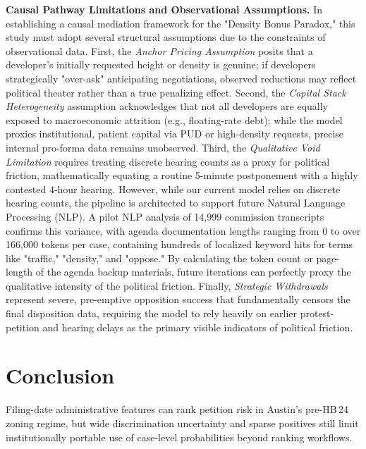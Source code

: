 \documentclass[11pt, letterpaper, oneside]{article}
\begin{document}
\textbf{Causal Pathway Limitations and Observational Assumptions.} In establishing a causal mediation framework for the "Density Bonus Paradox," this study must adopt several structural assumptions due to the constraints of observational data. First, the \textit{Anchor Pricing Assumption} posits that a developer's initially requested height or density is genuine; if developers strategically "over-ask" anticipating negotiations, observed reductions may reflect political theater rather than a true penalizing effect. Second, the \textit{Capital Stack Heterogeneity} assumption acknowledges that not all developers are equally exposed to macroeconomic attrition (e.g., floating-rate debt); while the model proxies institutional, patient capital via PUD or high-density requests, precise internal pro-forma data remains unobserved. Third, the \textit{Qualitative Void Limitation} requires treating discrete hearing counts as a proxy for political friction, mathematically equating a routine 5-minute postponement with a highly contested 4-hour hearing. However, while our current model relies on discrete hearing counts, the pipeline is architected to support future Natural Language Processing (NLP). A pilot NLP analysis of 14,999 commission transcripts confirms this variance, with agenda documentation lengths ranging from 0 to over 166,000 tokens per case, containing hundreds of localized keyword hits for terms like "traffic," "density," and "oppose." By calculating the token count or page-length of the agenda backup materials, future iterations can perfectly proxy the qualitative intensity of the political friction. Finally, \textit{Strategic Withdrawals} represent severe, pre-emptive opposition success that fundamentally censors the final disposition data, requiring the model to rely heavily on earlier protest-petition and hearing delays as the primary visible indicators of political friction.

\section{Conclusion}

Filing-date administrative features can rank petition risk in Austin's pre-HB\,24 zoning regime, but wide discrimination uncertainty and sparse positives still limit institutionally portable use of case-level probabilities beyond ranking workflows.
\end{document}
